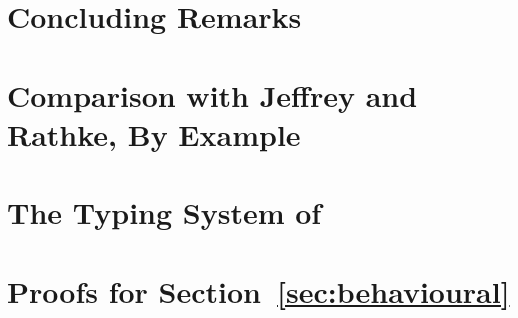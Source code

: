 \documentclass[smallcondensed]{svjour3}
\begin{document}
\section{Concluding Remarks}
\label{sec:concl}




%
%
{}

\newpage
\appendix 
\section{Comparison with Jeffrey and Rathke, By Example}
\label{app:jandr}


\section{The Typing System of \HOp}
\label{app:types}




\section{Proofs for Section~\ref{sec:behavioural}}
\label{app:beh}

\end{document}
